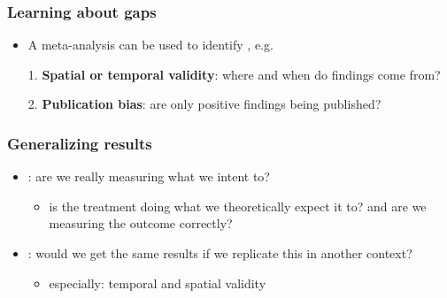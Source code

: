 \documentclass[aspectratio=43]{beamer}
\begin{document}
\begin{frame}
\frametitle{Learning about gaps}
\centering

\begin{itemize}
  \item A meta-analysis can be used to identify , e.g.
  \item[1.] \textbf{Spatial or temporal validity}: where and when do findings come from?
  \item[2.] \textbf{Publication bias}: are only positive findings being published?
\end{itemize}

\end{frame}


\begin{frame}
\frametitle{Generalizing results}
\centering

\begin{itemize}
  \item {}: are we really measuring what we intent to?
  \begin{itemize}
    \item is the treatment doing what we theoretically expect it to? and are we measuring the outcome correctly?
  \end{itemize}
  \item[]
  \item {}: would we get the same results if we replicate this in another context?
  \begin{itemize}
    \item especially: temporal and spatial validity
  \end{itemize}
\end{itemize}

\end{frame}
\end{document}
